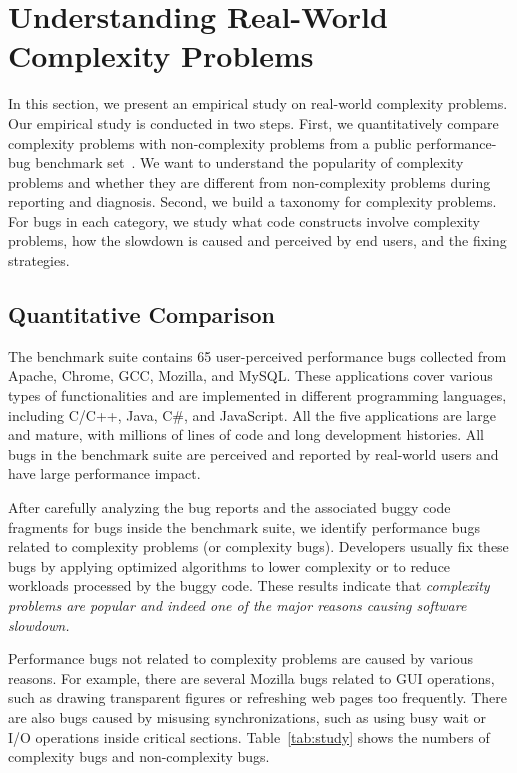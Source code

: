 \section{Understanding Real-World Complexity Problems}
\label{sec:study}


In this section, we present an empirical study on real-world 
complexity problems. Our empirical study is conducted in two steps.
First, we quantitatively compare complexity problems with non-complexity problems
from a public performance-bug benchmark set~\cite{PerfBug,SongOOPSLA2014,ldoctor}. 
We want to understand the popularity of complexity problems 
and whether they are different from non-complexity 
problems during reporting and diagnosis. 
Second, we build a taxonomy for complexity problems. 
For bugs in each category, 
we study what code constructs involve complexity problems,
how the slowdown is caused and perceived by end users, 
and the fixing strategies. 



\subsection{Quantitative Comparison}
\label{sec:compare}

The benchmark suite contains 65 user-perceived performance bugs 
collected from  Apache, Chrome, GCC, Mozilla, and MySQL. 
These applications cover various types of functionalities and are implemented 
in different programming languages, including C/C++, Java, C\#, and JavaScript. 
All the five applications are large and mature, 
with millions of lines of code and long development histories. 
All bugs in the benchmark suite are perceived and reported by real-world users
and have large performance impact. 

After carefully analyzing the bug reports and the associated buggy code fragments
for bugs inside the benchmark suite,
we identify \ComBugs performance bugs 
related to complexity problems (or complexity bugs). 
Developers usually fix these bugs by applying optimized algorithms to lower complexity
or to reduce workloads processed by the buggy code. 
These results indicate that \emph{complexity problems are popular and 
indeed one of the major reasons causing software slowdown.}

Performance bugs not related to complexity problems are caused by various reasons.
For example, there are several Mozilla bugs related to GUI operations, 
such as drawing transparent figures or refreshing web pages too frequently. 
There are also bugs caused by misusing synchronizations, 
such as using busy wait or I/O operations inside critical sections. 
Table~\ref{tab:study} shows the numbers of complexity bugs and non-complexity bugs.



